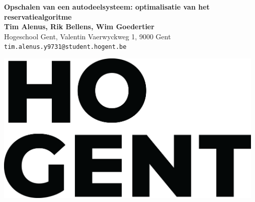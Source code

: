 \documentclass[a0,portrait]{a0poster}
\begin{document}


\begin{minipage}[t]{0.75\linewidth}
\VeryHuge \color{HoGentAccent1} \textbf{Opschalen van een autodeelsysteem: optimalisatie van het reservatiealgoritme} \color{Black}\\ %
\huge \textbf{Tim Alenus, Rik Bellens, Wim Goedertier}\\[0.5cm] %
\huge Hogeschool Gent, Valentin Vaerwyckweg 1, 9000 Gent\\[0.4cm] %
\Large \texttt{tim.alenus.y9731@student.hogent.be} \\
\end{minipage}
%
\begin{minipage}[t]{0.25\linewidth}
\includegraphics[width=13cm,right]{figures/HOGENT_Logo_Pos_rgb.png} 

\end{minipage}

\vspace{1cm} %

\end{document}
